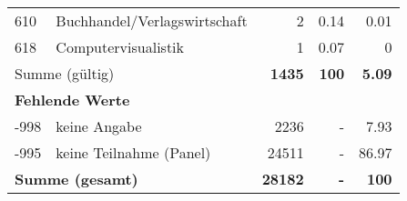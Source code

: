 \begin{longtable}{lXrrr}
        610 & \multicolumn{1}{X}{Buchhandel/Verlagswirtschaft} & %
          \num{2} &
          \num[round-mode=places,round-precision=2]{0,14} &
          \num[round-mode=places,round-precision=2]{0,01} \\

        618 & \multicolumn{1}{X}{Computervisualistik} & %
          \num{1} &
          \num[round-mode=places,round-precision=2]{0,07} &
          \num[round-mode=places,round-precision=2]{0} \\

     \midrule
     \multicolumn{2}{l}{Summe (gültig)} &
       \textbf{\num{1435}} &
     \textbf{100} &
       \textbf{\num[round-mode=places,round-precision=2]{5,09}} \\
     \multicolumn{5}{l}{\textbf{Fehlende Werte}}\\
       -998 &
       keine Angabe &
         \num{2236} &
        - &
         \num[round-mode=places,round-precision=2]{7,93} \\
       -995 &
       keine Teilnahme (Panel) &
         \num{24511} &
        - &
         \num[round-mode=places,round-precision=2]{86,97} \\
     \midrule
     \multicolumn{2}{l}{\textbf{Summe (gesamt)}} &
          \textbf{\num{28182}} &
        \textbf{-} &
        \textbf{100} \\
     \bottomrule
     \end{longtable}
     
